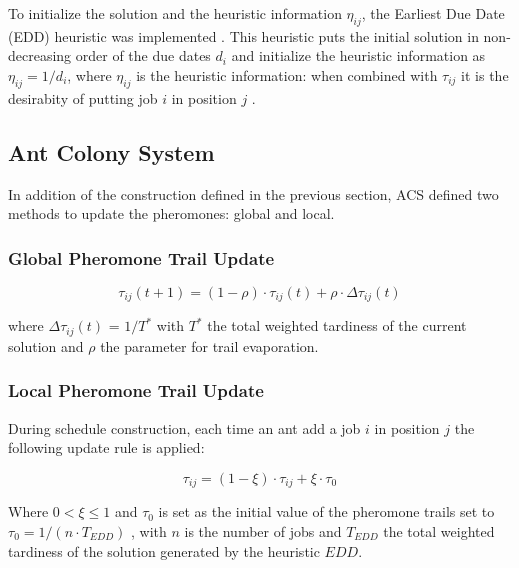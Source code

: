 \documentclass[runningheads]{llncs}
\begin{document}
\label{heuristic}

To initialize the solution and the heuristic information $\eta_{ij}$, the Earliest Due Date (EDD) heuristic was implemented \cite{den_besten_ant_2000}. This heuristic puts the initial solution in non-decreasing order of the due dates $d_i$ and initialize the heuristic information as $\eta_{ij} = 1/d_i$, where $\eta_{ij}$ is the heuristic information: when combined with $\tau_{ij}$
it is the desirabity of putting job $i$ in position $j$ \cite{den_besten_ant_2000}.





\subsection{Ant Colony System}

In addition of the construction defined in the previous section, ACS defined two methods to update the pheromones: global and local.

\subsubsection{Global Pheromone Trail Update}

\begin{equation}
\tau_{ij}(t+1) = (1 - \rho) \cdot \tau_{ij}(t) + \rho \cdot \Delta \tau_{ij}(t)
\end{equation}

where $\Delta \tau_{ij}(t)$ = $ 1 / T^{*}$ with $T^*$ the total weighted tardiness of the current solution and $\rho$ the parameter for trail evaporation.

\subsubsection{Local Pheromone Trail Update}

During schedule construction, each time an ant add a job $i$ in position $j$ the following update rule \cite{den_besten_ant_2000} is applied:

\begin{equation}
\tau_{ij} = (1 - \xi) \cdot \tau_{ij} + \xi \cdot \tau_{0}
\end{equation}

Where $0 < \xi \le 1$ and $\tau_0$ is set as the initial value of the pheromone trails set to $\tau_0 = 1 / (n \cdot T_{EDD})$ \cite{den_besten_ant_2000}, with $n$ is the number of jobs and
$T_{EDD}$ the total weighted tardiness of the solution generated by the heuristic $EDD$.
\end{document}
